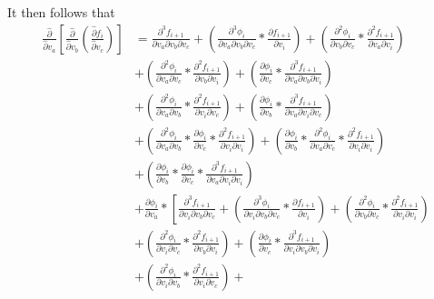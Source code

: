 \documentclass[12pt,letter]{article}
\begin{document}
	It then follows that
	\begin{equation}
	\begin{split}
	\frac{\hat{\partial}}{\hat{\partial}  v_a}\left[\frac{\hat{\partial}}{\hat{\partial} v_b}\left(\frac{\hat{\partial} f_i}{\hat{\partial} v_c}\right)\right]
	&= 
	\frac{\partial^3 f_{i+1}}{\partial v_a \partial v_b \partial v_c} + 
	\left(\frac{\partial^3 \phi_i}{\partial v_a \partial v_b \partial v_c} * \frac{\partial f_{i+1}}{\partial v_i}\right) + 
	\left(\frac{\partial^2 \phi_i}{\partial v_b \partial v_c} * \frac{\partial^2 f_{i+1}}{\partial v_a \partial v_i}\right) 
	\\
	&+
	\left(\frac{\partial^2 \phi_i}{\partial v_a \partial v_c} * \frac{\partial^2 f_{i+1}}{\partial v_b \partial v_i}\right) + 
	\left(\frac{\partial \phi_i}{\partial v_c} * \frac{\partial^3 f_{i+1}}{\partial v_a \partial v_b \partial v_i}\right) 
	\\
	&+
	\left(\frac{\partial^2 \phi_i}{\partial v_a \partial v_b} * \frac{\partial^2 f_{i+1}}{\partial v_i \partial v_c}\right) + 
	\left(\frac{\partial \phi_i}{\partial v_b} * \frac{\partial^3 f_{i+1}}{\partial v_a \partial v_i \partial v_c}\right) 
	\\
	&+
	\left(\frac{\partial^2 \phi_i}{\partial v_a \partial v_b} * \frac{\partial \phi_i}{\partial v_c} * \frac{\partial^2 f_{i+1}}{\partial v_i \partial v_i}\right) + 
	\left(\frac{\partial \phi_i}{\partial v_b} * \frac{\partial^2 \phi_i}{\partial v_a \partial v_c} * \frac{\partial^2 f_{i+1}}{\partial v_i \partial v_i}\right) 
	\\
	&+
	\left(\frac{\partial \phi_i}{\partial v_b} * \frac{\partial \phi_i}{\partial v_c} * \frac{\partial^3 f_{i+1}}{\partial v_a \partial v_i \partial v_i}\right) 
	\\
	&+
	\frac{\partial \phi_i}{\partial v_a} * 
	\left[\frac{\partial^3 f_{i+1}}{\partial v_i \partial v_b \partial v_c} + 
	\left(\frac{\partial^3 \phi_i}{\partial v_i \partial v_b \partial v_c} * \frac{\partial f_{i+1}}{\partial v_i}\right) + 
	\left(\frac{\partial^2 \phi_i}{\partial v_b \partial v_c} * \frac{\partial^2 f_{i+1}}{\partial v_i \partial v_i}\right) 
	\right.
	\\
	&
	\left.
	+ \left(\frac{\partial^2 \phi_i}{\partial v_i \partial v_c} * \frac{\partial^2 f_{i+1}}{\partial v_b \partial v_i}\right) + 
	\left(\frac{\partial \phi_i}{\partial v_c} * \frac{\partial^3 f_{i+1}}{\partial v_i \partial v_b \partial v_i}\right) 
	\right.
	\\
	&
	\left.
	+ \left(\frac{\partial^2 \phi_i}{\partial v_i \partial v_b} * \frac{\partial^2 f_{i+1}}{\partial v_i \partial v_c}\right) + 

\end{split}
\end{equation}
\end{document}
